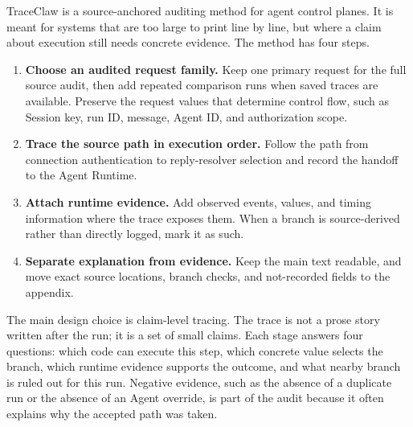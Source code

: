 \documentclass[11pt,a4paper]{article}
\begin{document}
TraceClaw is a source-anchored auditing method for agent control planes.
It is meant for systems that are too large to print line by line, but
where a claim about execution still needs concrete evidence. The method
has four steps.

\begin{enumerate}
    \item \textbf{Choose an audited request family.} Keep one primary
    request for the full source audit, then add repeated comparison runs
    when saved traces are available. Preserve the request values that
    determine control flow, such as Session key, run ID, message, Agent
    ID, and authorization scope.

    \item \textbf{Trace the source path in execution order.} Follow the
    path from connection authentication to reply-resolver selection and
    record the handoff to the Agent Runtime.

    \item \textbf{Attach runtime evidence.} Add observed events, values,
    and timing information where the trace exposes them. When a branch is
    source-derived rather than directly logged, mark it as such.

    \item \textbf{Separate explanation from evidence.} Keep the main text
    readable, and move exact source locations, branch checks, and
    not-recorded fields to the appendix.
\end{enumerate}

The main design choice is claim-level tracing. The trace is not a prose
story written after the run; it is a set of small claims. Each stage
answers four questions: which code can execute this step, which concrete
value selects the branch, which runtime evidence supports the outcome,
and what nearby branch is ruled out for this run. Negative evidence,
such as the absence of a duplicate run or the absence of an Agent
override, is part of the audit because it often explains why the accepted
path was taken.
\end{document}
